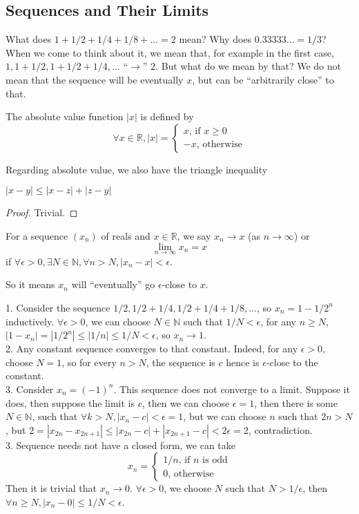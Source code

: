 \subsection{Sequences and Their Limits}
What does $1+1/2+1/4+1/8+\ldots=2$ mean?
Why does $0.33333\ldots=1/3$?
When we come to think about it, we mean that, for example in the first case, $1,1+1/2,1+1/2+1/4,\ldots$ ``$\to$'' $2$.
But what do we mean by that?
We do not mean that the sequence will be eventually $x$, but can be ``arbitrarily close'' to that.
\begin{definition}
    The absolute value function $|x|$ is defined by
    $$\forall x\in\mathbb R,|x|=
    \begin{cases}
        x\text{, if $x\ge 0$}\\
        -x\text{, otherwise}
    \end{cases}$$
\end{definition}
Regarding absolute value, we also have the triangle inequality
\begin{proposition}
    $|x-y|\le|x-z|+|z-y|$
\end{proposition}
\begin{proof}
    Trivial.
\end{proof}
\begin{definition}
    For a sequence $(x_n)$ of reals and $x\in\mathbb R$, we say $x_n\to x$ (as $n\to\infty$) or
    $$\lim_{n\to\infty}x_n=x$$
    if $\forall\epsilon>0,\exists N\in\mathbb N,\forall n>N,|x_n-x|<\epsilon$.
\end{definition}
So it means $x_n$ will ``eventually'' go $\epsilon$-close to $x$.
\begin{example}
    1. Consider the sequence $1/2,1/2+1/4,1/2+1/4+1/8,\ldots$, so $x_n=1-1/2^n$ inductively.
    $\forall\epsilon>0$, we can choose $N\in\mathbb N$ such that $1/N<\epsilon$, for any $n\ge N$, $|1-x_n|=|1/2^n|\le |1/n|\le 1/N<\epsilon$, so $x_n\to 1$.\\
    2. Any constant sequence converges to that constant.
    Indeed, for any $\epsilon>0$, choose $N=1$, so for every $n>N$, the sequence is $c$ hence is $\epsilon$-close to the constant.\\
    3. Consider $x_n=(-1)^n$.
    This sequence does not converge to a limit.
    Suppose it does, then suppose the limit is $c$, then we can choose $\epsilon=1$, then there is some $N\in\mathbb N$, such that $\forall k>N, |x_n-c|<\epsilon=1$, but we can choose $n$ such that $2n>N$, but $2=|x_{2n}-x_{2n+1}|\le |x_{2n}-c|+|x_{2n+1}-c|<2\epsilon=2$, contradiction.\\
    3. Sequence needs not have a closed form, we can take
    $$x_n=
    \begin{cases}
        1/n\text{, if $n$ is odd}\\
        0\text{, otherwise}
    \end{cases}$$
    Then it is trivial that $x_n\to 0$.
    $\forall\epsilon>0$, we choose $N$ such that $N>1/\epsilon$, then $\forall n\ge N,|x_n-0|\le 1/N<\epsilon$.
\end{example}
